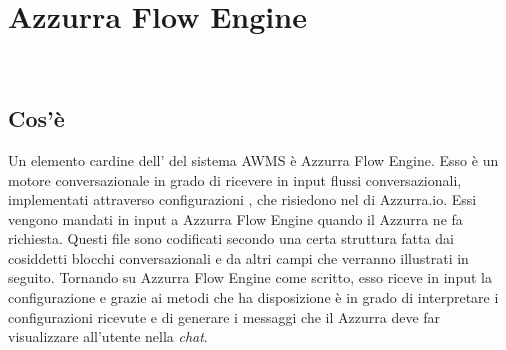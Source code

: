 
\chapter{Azzurra Flow Engine}
\label{cap:flow engine}
\\


\section{Cos'è}
Un elemento cardine dell' del sistema \gls{AWMS} è Azzurra Flow Engine. Esso è un motore conversazionale in grado di ricevere in input flussi conversazionali, implementati attraverso configurazioni , che risiedono nel  di Azzurra.io. Essi vengono mandati in input a Azzurra Flow Engine quando il  Azzurra ne fa richiesta. Questi file sono codificati secondo una certa struttura fatta dai cosiddetti blocchi conversazionali e da altri campi che verranno illustrati in seguito. Tornando su Azzurra Flow Engine come scritto, esso riceve in input la configurazione  e grazie ai metodi che ha disposizione è in grado di interpretare i configurazioni  ricevute e di generare i messaggi che il  Azzurra deve far visualizzare all'utente nella \emph{chat}.

